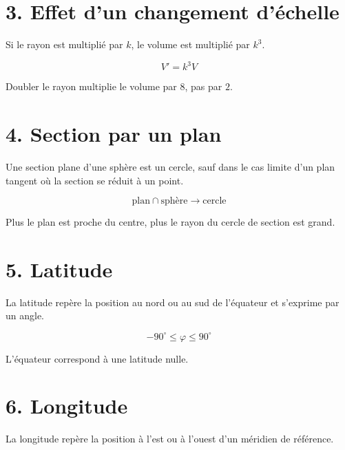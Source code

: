 
\section{3. Effet d’un changement d’échelle}
Si le rayon est multiplié par $k$, le volume est multiplié par $k^3$.

\[
V'=k^3V
\]

\begin{exemple}
Doubler le rayon multiplie le volume par $8$, pas par $2$.
\end{exemple}

\section{4. Section par un plan}
Une section plane d’une sphère est un cercle, sauf dans le cas limite d’un plan tangent où la section se réduit à un point.

\[
\text{plan}\cap\text{sphère}\rightarrow\text{cercle}
\]

\begin{exemple}
Plus le plan est proche du centre, plus le rayon du cercle de section est grand.
\end{exemple}

\section{5. Latitude}
La latitude repère la position au nord ou au sud de l’équateur et s’exprime par un angle.

\[
-90^\circ\le\varphi\le90^\circ
\]

\begin{exemple}
L’équateur correspond à une latitude nulle.
\end{exemple}


\section{6. Longitude}
La longitude repère la position à l’est ou à l’ouest d’un méridien de référence.

